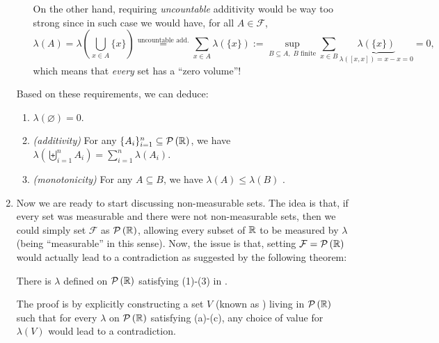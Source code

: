\begin{enumerate}
\begin{enumerate}[label={(\arabic*)}]
\begin{note}
On the other hand, requiring \emph{uncountable} additivity would be way too
strong since in such case we would have, for all \(A\in\mathcal{F}\),
\[
\lambda(A)=\lambda\left(\bigcup_{x\in A}\{x\}\right)
\overset{\text{uncountable add.}}{=}
\sum_{x\in A}^{}\lambda(\{x\})
:=\sup_{B\subseteq A,\; B\text{ finite}}\sum_{x\in B}^{}\underbrace{\lambda(\{x\})}_{\lambda([x,x])=x-x=0}
=0,
\]
which means that \emph{every} set has a ``zero volume''!
\end{note}
\end{enumerate}
Based on these requirements, we can deduce:
\begin{enumerate}
\item \(\lambda(\varnothing)=0\).
\item \emph{(additivity)} For any \(\{A_i\}_{i=1}^{n}\subseteq\mathcal{P}\left(\mathbb{R}\right)\), we have
\(\lambda(\biguplus_{i=1}^{n}A_i)=\sum_{i=1}^{n}\lambda(A_i)\).
\item \emph{(monotonicity)} For any \(A\subseteq B\), we have
\(\lambda(A)\le\lambda(B)\) .
\end{enumerate}
\begin{pf}
\begin{enumerate}
\item \(\lambda(\varnothing)=\lambda((a,a])=a-a=0\).
\item \(\lambda(\biguplus_{i=1}^{n}A_i)=\lambda(\biguplus_{i=1}^{n}A_i\uplus\varnothing\uplus\varnothing\uplus\dotsb)
\overset{\text{\(\sigma\)-add.}}{=}\sum_{i=1}^{n}\lambda(A_i)+\sum_{i=n+1}^{\infty}0=\sum_{i=1}^{n}\lambda(A_i)\).
\item \(\lambda(B)=\lambda(B\uplus(B\setminus A))=\lambda(A)
+\underbrace{\lambda(B\setminus A)}_{\ge 0}\ge \lambda(A)\).
\end{enumerate}
\end{pf}
\item Now we are ready to start discussing non-measurable sets. The idea is
that, if every set was measurable and there were not non-measurable sets, then
we could simply set \(\mathcal{F}\) as \(\mathcal{P}\left(\mathbb{R}\right)\), allowing every subset of
\(\mathbb{R}\) to be measured by \(\lambda\) (being ``measurable'' in this sense). Now,
the issue is that, setting \(\mathcal{F}=\mathcal{P}\left(\mathbb{R}\right)\) would actually lead to a
contradiction \warn{} as suggested by the following theorem:

\begin{theorem}
\label{thm:vitali}
There is  \(\lambda\) defined on \(\mathcal{P}\left(\mathbb{R}\right)\) satisfying (1)-(3) in
.
\end{theorem}
\begin{pf}
The proof is by explicitly constructing a set \(V\) (known as ) living in \(\mathcal{P}\left(\mathbb{R}\right)\) such that for every \(\lambda\) on \(\mathcal{P}\left(\mathbb{R}\right)\)
satisfying (a)-(c), any choice of value for \(\lambda(V)\) would lead to a
contradiction.


\end{pf}
\end{enumerate}
